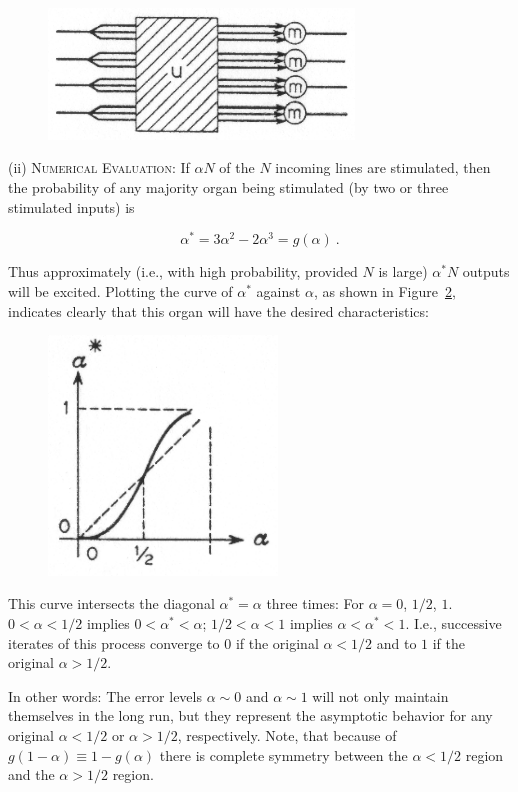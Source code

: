 \documentclass[twocolumn,preprintnumbers,amsmath,amssymb,floatfix]{revtex4}
\begin{document}
\begin{figure}
\includegraphics[width=3.2in]{fig_32}
\caption{\label{fig:32}}
\end{figure}

\noindent (ii) \textsc{Numerical Evaluation}: If $\alpha N$ of the
$N$ incoming lines are stimulated, then the probability of any
majority organ being stimulated (by two or three stimulated
inputs) is

\begin{equation}
\alpha^*=3\alpha^2-2\alpha^3=g(\alpha)~. \label{eq:14}
\end{equation}

\noindent Thus approximately (i.e., with high probability,
provided $N$ is large) $\alpha^* N$ outputs will be excited.
Plotting the curve of $\alpha^*$ against $\alpha$, as shown in
Figure~\ref{fig:33}, indicates clearly that this organ will have
the desired characteristics:

\begin{figure}[b]
\includegraphics[width=2.4in]{fig_33}
\caption{\label{fig:33}}
\end{figure}

This curve intersects the diagonal $\alpha^*=\alpha$ three times:
For $\alpha=0$, $1/2$, $1$. $0<\alpha<1/2$ implies
$0<\alpha^*<\alpha$; $1/2<\alpha<1$ implies $\alpha<\alpha^*<1$.
I.e., successive iterates of this process converge to $0$ if the
original $\alpha<1/2$ and to $1$ if the original $\alpha>1/2$.

In other words: The error levels $\alpha\sim0$ and $\alpha\sim1$
will not only maintain themselves in the long run, but they
represent the asymptotic behavior for any original $\alpha<1/2$ or
$\alpha>1/2$, respectively. Note, that because of
$g(1-\alpha)\equiv1-g(\alpha)$ there is complete symmetry between
the $\alpha<1/2$ region and the $\alpha>1/2$ region.
\end{document}
